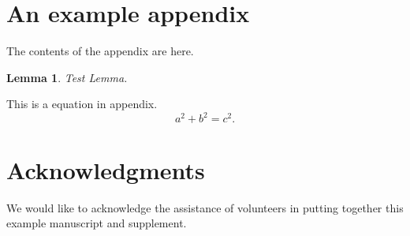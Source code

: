 \documentclass{article}
\theoremstyle{plain}
\newtheorem{lemma}{Lemma}[section]
\theoremstyle{definition}
\theoremstyle{remark}
\numberwithin{equation}{section}
\numberwithin{figure}{section}
\numberwithin{table}{section}
\begin{document}
\appendix
\section{An example appendix}

The contents of the appendix are here.

\begin{lemma}
Test Lemma.
\end{lemma}

This is a equation in appendix.
\begin{equation}\label{eq:A1}
  a^2+b^2=c^2.
\end{equation}


\section*{Acknowledgments}

We would like to acknowledge the assistance of volunteers in putting together this example manuscript and supplement.


%


{}

\end{document}

